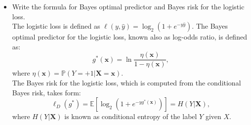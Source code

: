 \begin{itemize}
  \item Write the formula for Bayes optimal predictor and Bayes risk for the logistic loss.\\

        The logistic loss is defined as $\ell(y, \hat{y}) = \log_2 (1 + e^{-y\hat{y}})$. The Bayes optimal predictor for the logistic loss, known also as log-odds ratio, is defined as:
        $$g^*(\boldsymbol{x}) = \ln \frac{\eta(\boldsymbol{x})}{1-\eta(\boldsymbol{x})},$$
        where $\eta(\boldsymbol{x}) = \mathbb{P} (Y=+1|\boldsymbol{X} = \boldsymbol{x})$.\\
        The Bayes risk for the logistic loss, which is computed from the conditional Bayes risk, takes form:
        $$\ell_D (g^*) = \mathbb{E}[\log_2(1+e^{-yg^*(\boldsymbol{x})})] = H(Y|\boldsymbol{X}),$$
        where $H(Y|\boldsymbol{X})$ is known as conditional entropy of the label $Y$ given $X$.

\end{itemize}
